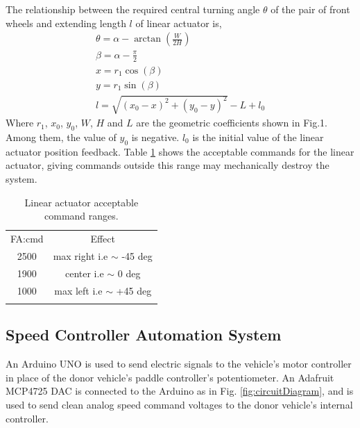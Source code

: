 \documentclass[a4paper]{article}
\begin{document}
	The relationship between the required central turning angle $\theta$ of the pair of front wheels and extending length $l$ of linear actuator is,    
	\begin{gather}
	\theta = \alpha - \arctan(\frac{W}{2H}) \\
	\beta = \alpha -\frac{\pi}{2}\\
	x = r_1 \cos(\beta) \\
	y = r_1 \sin(\beta) \\
	l = \sqrt{(x_0-x)^2 + (y_0-y)^2} - L + l_0    
	\end{gather}    
	Where $r_1$, $x_0$, $y_0$, $W$, $H$ and $L$ are the geometric coefficients shown in Fig.1. Among them, the value of $y_0$ is negative. $l_0$ is the initial value of the linear actuator position feedback. Table \ref{tab:linear_actuator} shows the acceptable commands for the linear actuator, giving commands outside this range may mechanically destroy the system.  
	\begin{table}
		\begin{center}
			\caption{Linear actuator acceptable command ranges.}
			\label{tab:linear_actuator}
			\begin{tabular}{ c c }
				\hline
				FA:cmd     &  Effect \\
				2500    &    max right i.e $\sim$ -45 deg \\
				1900    &    center i.e $\sim$ 0 deg \\ 
				1000    &    max left i.e $\sim$ +45 deg \\
				\hline\\
			\end{tabular}
		\end{center}   
	\end{table}
	
	
	\subsection{Speed Controller Automation System}
	
	An Arduino UNO \cite{oxer2011practical} is used to send electric signals to the vehicle's motor controller in place of the donor vehicle’s paddle controller’s potentiometer. An Adafruit MCP4725 DAC is connected to the Arduino as in Fig. \ref{fig:circuitDiagram}, and is used to send clean analog speed command voltages to the donor vehicle’s internal controller.
	
\end{document}
